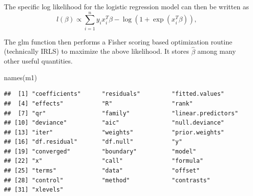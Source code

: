 \documentclass[
  ignorenonframetext,
]{beamer}
\newenvironment{Shaded}{\begin{snugshade}}{\end{snugshade}}
\newcommand{\FunctionTok}[1]{\textcolor[rgb]{0.00,0.00,0.00}{#1}}
\newcommand{\NormalTok}[1]{#1}
\begin{document}
\begin{frame}[fragile]{}
\protect\hypertarget{section-6}{}
The specific log likelihood for the logistic regression model can then
be written as \[
  l(\beta) \propto \sum_{i=1}^n y_ix_i^T\beta - \log\left(1 + \exp(x_i^T\beta)\right),
\]

\vspace{12pt}

The glm function then performs a Fisher scoring based optimization
routine (technically IRLS) to maximize the above likelihood. It stores
\(\hat\beta\) among many other useful quantities.

\vspace{12pt}
\tiny

\begin{Shaded}
\begin{Highlighting}[]
\FunctionTok{names}\NormalTok{(m1)}
\end{Highlighting}
\end{Shaded}

\begin{verbatim}
##  [1] "coefficients"      "residuals"         "fitted.values"    
##  [4] "effects"           "R"                 "rank"             
##  [7] "qr"                "family"            "linear.predictors"
## [10] "deviance"          "aic"               "null.deviance"    
## [13] "iter"              "weights"           "prior.weights"    
## [16] "df.residual"       "df.null"           "y"                
## [19] "converged"         "boundary"          "model"            
## [22] "x"                 "call"              "formula"          
## [25] "terms"             "data"              "offset"           
## [28] "control"           "method"            "contrasts"        
## [31] "xlevels"
\end{verbatim}
\end{frame}
\end{document}
